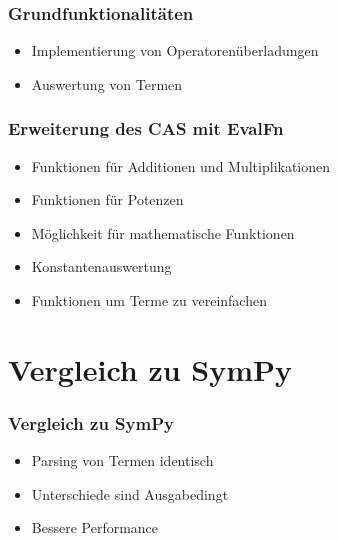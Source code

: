 \documentclass{beamer}
\begin{document}
\begin{frame}[fragile]
  \frametitle{Grundfunktionalitäten}
  \begin{itemize}
    \item Implementierung von Operatorenüberladungen
    \pause
    \item Auswertung von Termen
  \end{itemize}
\end{frame}

\begin{frame}[fragile]
  \frametitle{Erweiterung des CAS mit EvalFn}
  \begin{itemize}
    \item Funktionen für Additionen und Multiplikationen
    \pause
    \item Funktionen für Potenzen
    \pause
    \item Möglichkeit für mathematische Funktionen
    \pause
    \item Konstantenauswertung
    \pause
    \item Funktionen um Terme zu vereinfachen
  \end{itemize}
\end{frame}



\section{Vergleich zu SymPy}
\begin{frame}[fragile]
  \frametitle{Vergleich zu SymPy}
  \begin{itemize}
    \item Parsing von Termen identisch
    \pause
    \item Unterschiede sind Ausgabedingt
    \pause
    \item Bessere Performance
  \end{itemize}
\end{frame}
\end{document}

